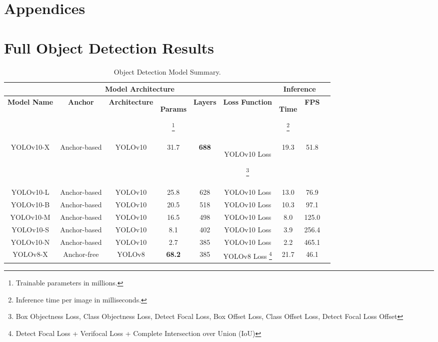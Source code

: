 \onecolumn

\section{Appendices}

\appendix

\section{Full Object Detection Results}

\begin{longtable}{|c|c|c|c|c|c|c|c|c|}
\caption {Object Detection Model Summary.}
\label{fig:modelsummary}
\hline
\multicolumn{6}{|c|}{\textbf{Model Architecture}} & \multicolumn{2}{c|}{\textbf{Inference}} \\
\hline
\textbf{Model Name} & \textbf{Anchor} & \textbf{Architecture} & \textbf{Params}\begin{scriptsize}\footnote{Trainable parameters in millions.}\end{scriptsize} & \textbf{Layers} & \textbf{Loss Function} & \textbf{Time} \begin{scriptsize}\footnote{Inference time per image in milliseconds.}\end{scriptsize} & \textbf{FPS} \\
\hline
YOLOv10-X & Anchor-based & YOLOv10 & 31.7 & \textbf{688} & YOLOv10 Loss\begin{scriptsize}\footnote{Box Objectness Loss, Class Objectness Loss, Detect Focal Loss, Box Offset Loss, Class Offset Loss, Detect Focal Loss Offset}\end{scriptsize}  & 19.3 & 51.8  \\ 
YOLOv10-L & Anchor-based & YOLOv10 & 25.8 & 628 & YOLOv10 Loss & 13.0 & 76.9  \\ 
YOLOv10-B & Anchor-based & YOLOv10 & 20.5 & 518 & YOLOv10 Loss & 10.3 & 97.1  \\ 
YOLOv10-M & Anchor-based & YOLOv10 & 16.5 & 498 & YOLOv10 Loss & 8.0 & 125.0  \\ 
YOLOv10-S & Anchor-based & YOLOv10 & 8.1 & 402 & YOLOv10 Loss & 3.9 & 256.4  \\ 
YOLOv10-N & Anchor-based & YOLOv10 & 2.7 & 385 & YOLOv10 Loss & 2.2 & 465.1  \\ 
YOLOv8-X & Anchor-free & YOLOv8 & \textbf{68.2} & 385 & YOLOv8 Loss \footnote{Detect Focal Loss + Verifocal Loss + Complete Intersection over Union (IoU)} & 21.7 & 46.1  \\ 

\end{longtable}
